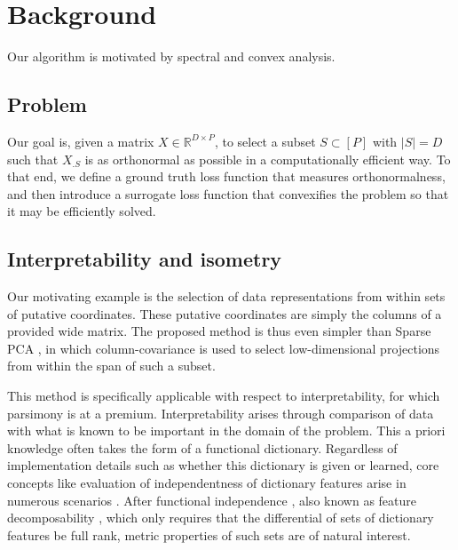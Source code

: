 \section{Background}

Our algorithm is motivated by spectral and convex analysis.

\subsection{Problem}

Our goal is, given a matrix $ X \in \mathbb R^{D \times P}$, to select a subset $ S \subset [P]$ with $| S| = D$ such that $X_{.  S}$ is as orthonormal as possible in a computationally efficient way.
To that end, we define a ground truth loss function that measures orthonormalness, and then introduce a surrogate loss function that convexifies the problem so that it may be efficiently solved.

\subsection{Interpretability and isometry}

Our motivating example is the selection of data representations from within sets of putative coordinates.
These putative coordinates are simply the columns of a provided wide matrix.
The proposed method is thus even simpler than Sparse PCA \citep{Dey2017-mx, Bertsimas2022-qo, Bertsimas2022-dv}, in which column-covariance is used to select low-dimensional projections from within the span of such a subset.

This method is specifically applicable with respect to interpretability, for which parsimony is at a premium.
Interpretability arises through comparison of data with what is known to be important in the domain of the problem.
This a priori knowledge often takes the form of a functional dictionary.
Regardless of implementation details such as whether this dictionary is given or learned, core concepts like evaluation of independentness of dictionary features arise in numerous scenarios \citep{Chen2019-km, Koelle2022-ju, He2023-ch}.
After functional independence \citep{Koelle2022-ju}, also known as feature decomposability \citep{templeton2024scaling}, which only requires that the differential of sets of dictionary features be full rank, metric properties of such sets are of natural interest.

